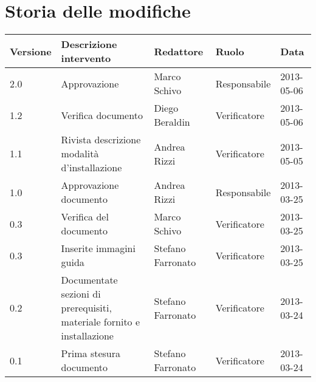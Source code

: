 \newcommand{\docName}{Manuale di installazione}
\newcommand{\docFileName}{manuale\_di\_installazione.2.0.pdf}
\newcommand{\docVers}{2.0}
\newcommand{\creationDate}{2013-03-24}
\newcommand{\modificationDate}{2013-05-06}
\newcommand{\docState}{Approvato}
\newcommand{\docUsage}{Esterno}
\newcommand{\docDistributionList}{Installatore del sistema}
\newcommand{\docAuthors}{Stefano Farronato}
\newcommand{\approvedBy}{Marco Schivo}
\newcommand{\verifiedBy}{Diego Beraldin}
\newcommand{\docRoot}{..}
\def\INDICETABELLE{false}
\def\INDICEFIGURE{false}







\section*{Storia delle modifiche}

\begin{tabularx}{\textwidth}{lXlll}
\toprule
Versione & Descrizione intervento & Redattore & Ruolo & Data\\
\midrule %
2.0 & Approvazione & Marco Schivo & Responsabile & 2013-05-06\\
1.2 & Verifica documento & Diego Beraldin & Verificatore & 2013-05-06\\
1.1 & Rivista descrizione modalità d'installazione & Andrea Rizzi & Verificatore & 2013-05-05\\
1.0 & Approvazione documento& Andrea Rizzi & Responsabile & 2013-03-25\\
0.3 & Verifica del documento & Marco Schivo & Verificatore & 2013-03-25\\
0.3 & Inserite immagini guida& Stefano Farronato & Verificatore & 2013-03-25\\
0.2 & Documentate sezioni  di prerequisiti, materiale fornito e installazione& Stefano Farronato & Verificatore & 2013-03-24\\
0.1 & Prima stesura documento & Stefano Farronato & Verificatore & 2013-03-24\\
\bottomrule
\end{tabularx}
\newpage

